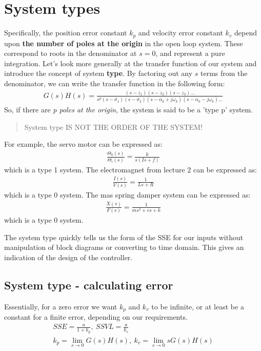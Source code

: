 \documentclass[class=report, crop=false, 12pt,a4paper]{standalone}
\begin{document}
\section{System types}
Specifically, the position error constant $k_p$ and velocity error constant $k_v$ depend upon \textbf{the number of poles at the origin} in the open loop system. These correspond to roots in the denominator at $s=0$, and represent a pure integration. Let's look more generally at the transfer function of our system and introduce the concept of system \textbf{type}. By factoring out any $s$ terms from the denominator, we can write the transfer function in the following form:
\begin{gather}
  G(s)H(s) = \frac{(s-z_1)(s-z_2)(s-z_3)...}{s^p(s-\sigma_1)(s-\sigma_2)(s-\alpha_k + j\omega_k)(s-\alpha_k - j\omega_k)...}
\end{gather}
So, if there are \textit{p poles at the origin}, the system is said to be a 'type p' system.
\begin{quote}
  System type IS NOT THE ORDER OF THE SYSTEM!
\end{quote}
For example, the servo motor can be expressed as:
\begin{gather}
  \frac{\Theta_0(s)}{\Theta_i(s)}=\frac{k}{s(Is +f)}
\end{gather}
which is a type 1 system. The electromagnet from lecture 2 can be expressed as:
\begin{gather}
  \frac{I(s)}{V(s)} = \frac{1}{Ls +R}
\end{gather}
which is a type 0 system. The mas spring damper system can be expressed as:
\begin{gather}
  \frac{X(s)}{F(s)} = \frac{1}{ms^2 + cs + k}
\end{gather}
which is a type 0 system.

The system type quickly tells us the form of the SSE for our inputs without manipulation of block diagrams or converting to time domain. This gives an indication of the design of the controller. 
\subsection{System type - calculating error}
Essentially, for a zero error we want $k_p$ and $k_v$ to be infinite, or at least be a constant for a finite error, depending on our requirements. 
\begin{gather}
  SSE = \frac{a}{1+ k_p}, \ SSVL = \frac{a}{k_v}\\
  k_p = \lim_{s\rightarrow 0} G(s)H(s), \ k_v = \lim_{s\rightarrow 0}sG(s)H(s)
\end{gather}
\end{document}
